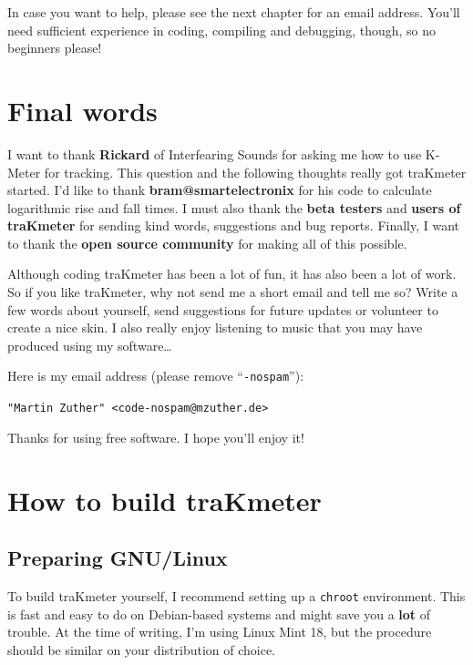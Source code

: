 In case you want to help, please see the next chapter for an email
address.  You’ll need sufficient experience in coding, compiling and
debugging, though, so no beginners please!

\chapter{Final words}
\label{chap:final_words}

I want to thank \textbf{Rickard} of Interfearing Sounds for asking me
how to use K-Meter for tracking.  This question and the following
thoughts really got traKmeter started.  I'd like to thank
\textbf{bram@smartelectronix} for his code to calculate logarithmic
rise and fall times.  I must also thank the \textbf{beta testers} and
\textbf{users of traKmeter} for sending kind words, suggestions and
bug reports.  Finally, I want to thank the \textbf{open source
  community} for making all of this possible.

Although coding traKmeter has been a lot of fun, it has also been a
lot of work.  So if you like traKmeter, why not send me a short email
and tell me so?  Write a few words about yourself, send suggestions
for future updates or volunteer to create a nice skin.  I also really
enjoy listening to music that you may have produced using my
software\dots

Here is my email address (please remove ``\texttt{-nospam}''):

\begin{center}
  \texttt{"Martin Zuther" <code-nospam@mzuther.de>}
\end{center}

Thanks for using free software.  I hope you'll enjoy it!

\appendix

\chapter{How to build traKmeter}
\label{chap:build_trakmeter}

\section{Preparing GNU/Linux}

To build traKmeter yourself, I recommend setting up a \texttt{chroot}
environment.  This is fast and easy to do on Debian-based systems and
might save you a \textbf{lot} of trouble.  At the time of writing, I'm
using Linux Mint 18, but the procedure should be similar on your
distribution of choice.

